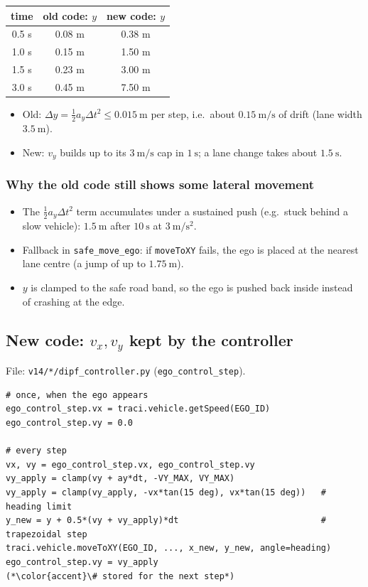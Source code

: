 \documentclass[11pt,a4paper]{article}
\begin{document}
\begin{center}
\begin{tabular}{ccc}
  \toprule
  time & old code: $y$ & new code: $y$ \\
  \midrule
  0.5 s & 0.08 m & 0.38 m \\
  1.0 s & 0.15 m & 1.50 m \\
  1.5 s & 0.23 m & 3.00 m \\
  3.0 s & 0.45 m & 7.50 m \\
  \bottomrule
\end{tabular}
\end{center}

\begin{itemize}
  \item Old: $\Delta y = \tfrac{1}{2} a_y \Delta t^2 \le 0.015~\mathrm{m}$ per step, i.e.\ about $0.15~\mathrm{m/s}$
        of drift (lane width $3.5~\mathrm{m}$).
  \item New: $v_y$ builds up to its $3~\mathrm{m/s}$ cap in $1~\mathrm{s}$; a lane change takes about $1.5~\mathrm{s}$.
\end{itemize}

\subsubsection*{Why the old code still shows some lateral movement}
\begin{itemize}
  \item The $\tfrac{1}{2} a_y \Delta t^2$ term accumulates under a sustained push (e.g.\ stuck behind a slow
        vehicle): $1.5~\mathrm{m}$ after $10~\mathrm{s}$ at $3~\mathrm{m/s^2}$.
  \item Fallback in \texttt{safe\_move\_ego}: if \texttt{moveToXY} fails, the ego is placed at the nearest lane
        centre (a jump of up to $1.75~\mathrm{m}$).
  \item $y$ is clamped to the safe road band, so the ego is pushed back inside instead of crashing at the edge.
\end{itemize}

\subsection{New code: $v_x, v_y$ kept by the controller}
File: \texttt{v14/*/dipf\_controller.py} (\texttt{ego\_control\_step}).
\begin{lstlisting}
# once, when the ego appears
ego_control_step.vx = traci.vehicle.getSpeed(EGO_ID)
ego_control_step.vy = 0.0

# every step
vx, vy = ego_control_step.vx, ego_control_step.vy
vy_apply = clamp(vy + ay*dt, -VY_MAX, VY_MAX)
vy_apply = clamp(vy_apply, -vx*tan(15 deg), vx*tan(15 deg))   # heading limit
y_new = y + 0.5*(vy + vy_apply)*dt                            # trapezoidal step
traci.vehicle.moveToXY(EGO_ID, ..., x_new, y_new, angle=heading)
ego_control_step.vy = vy_apply                                 (*\color{accent}\# stored for the next step*)
\end{lstlisting}
\end{document}
